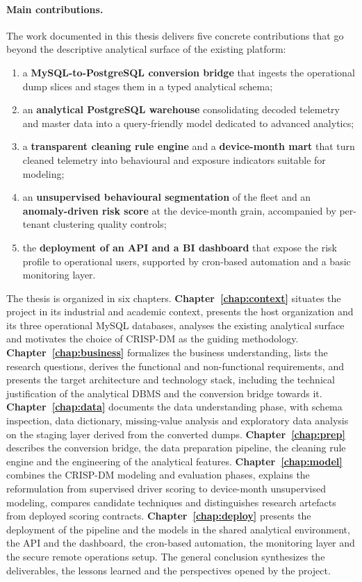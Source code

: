 \paragraph{Main contributions.} The work documented in this thesis delivers five concrete contributions that go beyond the descriptive analytical surface of the existing platform:
\begin{enumerate}
    \item a \textbf{MySQL-to-PostgreSQL conversion bridge} that ingests the operational dump slices and stages them in a typed analytical schema;
    \item an \textbf{analytical PostgreSQL warehouse} consolidating decoded telemetry and master data into a query-friendly model dedicated to advanced analytics;
    \item a \textbf{transparent cleaning rule engine} and a \textbf{device-month mart} that turn cleaned telemetry into behavioural and exposure indicators suitable for modeling;
    \item an \textbf{unsupervised behavioural segmentation} of the fleet and an \textbf{anomaly-driven risk score} at the device-month grain, accompanied by per-tenant clustering quality controls;
    \item the \textbf{deployment of an API and a BI dashboard} that expose the risk profile to operational users, supported by cron-based automation and a basic monitoring layer.
\end{enumerate}

The thesis is organized in six chapters. \textbf{Chapter~\ref{chap:context}} situates the project in its industrial and academic context, presents the host organization and its three operational MySQL databases, analyses the existing analytical surface and motivates the choice of CRISP-DM as the guiding methodology. \textbf{Chapter~\ref{chap:business}} formalizes the business understanding, lists the research questions, derives the functional and non-functional requirements, and presents the target architecture and technology stack, including the technical justification of the analytical DBMS and the conversion bridge towards it. \textbf{Chapter~\ref{chap:data}} documents the data understanding phase, with schema inspection, data dictionary, missing-value analysis and exploratory data analysis on the staging layer derived from the converted dumps. \textbf{Chapter~\ref{chap:prep}} describes the conversion bridge, the data preparation pipeline, the cleaning rule engine and the engineering of the analytical features. \textbf{Chapter~\ref{chap:model}} combines the CRISP-DM modeling and evaluation phases, explains the reformulation from supervised driver scoring to device-month unsupervised modeling, compares candidate techniques and distinguishes research artefacts from deployed scoring contracts. \textbf{Chapter~\ref{chap:deploy}} presents the deployment of the pipeline and the models in the shared analytical environment, the API and the dashboard, the cron-based automation, the monitoring layer and the secure remote operations setup. The general conclusion synthesizes the deliverables, the lessons learned and the perspectives opened by the project.

\cleardoublepage
